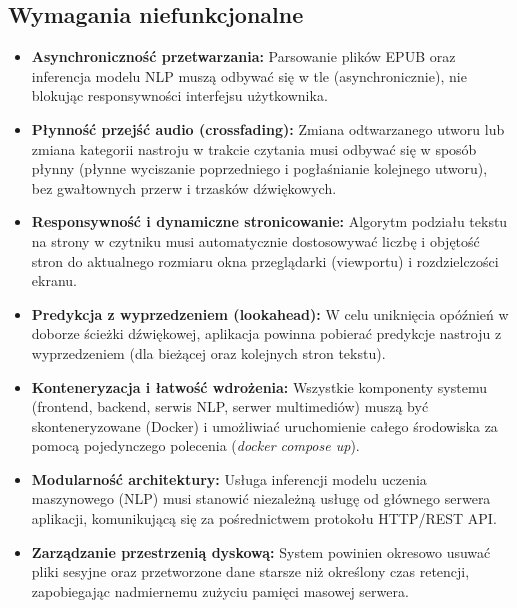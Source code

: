 \subsection{Wymagania niefunkcjonalne}
\begin{itemize}
      \item[\textbf{NF1:}] \textbf{Asynchroniczność przetwarzania:} Parsowanie plików EPUB oraz inferencja modelu
      NLP muszą odbywać się w tle (asynchronicznie), nie blokując responsywności interfejsu użytkownika.

      \item[\textbf{NF2:}] \textbf{Płynność przejść audio (crossfading):} Zmiana odtwarzanego utworu lub zmiana
      kategorii nastroju w trakcie czytania musi odbywać się w sposób płynny (płynne wyciszanie poprzedniego i
      pogłaśnianie kolejnego utworu), bez gwałtownych przerw i trzasków dźwiękowych.

      \item[\textbf{NF3:}] \textbf{Responsywność i dynamiczne stronicowanie:} Algorytm podziału tekstu na strony
      w czytniku musi automatycznie dostosowywać liczbę i objętość stron do aktualnego rozmiaru okna przeglądarki
      (viewportu) i rozdzielczości ekranu.

      \item[\textbf{NF4:}] \textbf{Predykcja z wyprzedzeniem (lookahead):} W celu uniknięcia opóźnień w doborze
      ścieżki dźwiękowej, aplikacja powinna pobierać predykcje nastroju z wyprzedzeniem (dla bieżącej oraz
      kolejnych stron tekstu).

      \item[\textbf{NF5:}] \textbf{Konteneryzacja i łatwość wdrożenia:} Wszystkie komponenty systemu (frontend,
      backend, serwis NLP, serwer multimediów) muszą być skonteneryzowane (Docker) i umożliwiać uruchomienie
      całego środowiska za pomocą pojedynczego polecenia (\textit{docker compose up}).

      \item[\textbf{NF6:}] \textbf{Modularność architektury:} Usługa inferencji modelu uczenia maszynowego (NLP)
      musi stanowić niezależną usługę od głównego serwera aplikacji, komunikującą się za pośrednictwem protokołu
      HTTP/REST API.

      \item[\textbf{NF7:}] \textbf{Zarządzanie przestrzenią dyskową:} System powinien okresowo usuwać pliki
      sesyjne oraz przetworzone dane starsze niż określony czas retencji, zapobiegając nadmiernemu zużyciu
      pamięci masowej serwera.
\end{itemize}



